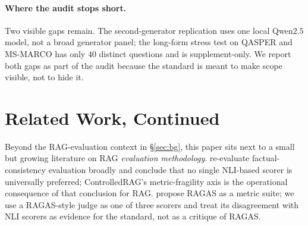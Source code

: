 \paragraph{Where the audit stops short.} Two visible gaps remain. The
second-generator replication uses one local Qwen$2.5$ model, not a
broad generator panel; the long-form stress test on QASPER and MS-MARCO
has only $40$ distinct questions and is supplement-only. We report both
gaps as part of the audit because the standard is meant to make scope
visible, not to hide it.

\section{Related Work, Continued}
\label{sec:related}

Beyond the RAG-evaluation context in \S\ref{sec:bg}, this paper sits
next to a small but growing literature on RAG \emph{evaluation
methodology}. \citet{honovich2022true} re-evaluate factual-consistency
evaluation broadly and conclude that no single NLI-based scorer is
universally preferred; ControlledRAG's metric-fragility axis is the
operational consequence of that conclusion for RAG.
\citet{es2024ragas} propose RAGAS as a metric suite; we use a
RAGAS-style judge as one of three scorers and treat its disagreement
with NLI scorers as evidence for the standard, not as a critique of
RAGAS.

